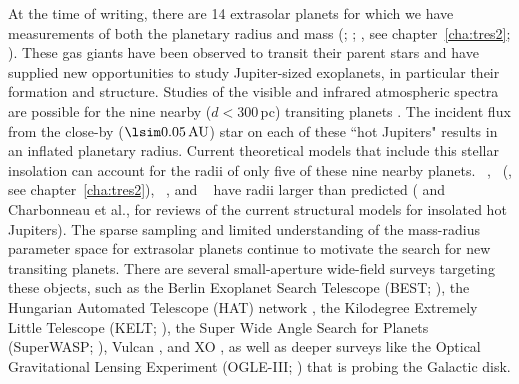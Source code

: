 At the time of writing, there are 14 extrasolar planets for which we have measurements of both the planetary radius and mass (\citealp*[see][for a review]{Charbonneau_Brown_Burrows:PPV:2007a}; \citealt{McCullough_Stys_Valenti:apj:2006a}; \citealt{ODonovan_Charbonneau_Mandushev:apjl:2006a}, see chapter~\ref{cha:tres2}; \citealt{Bakos_Noyes_Kovacs:apj:2007a, Collier-Cameron_Bouchy_Hebrard:MNRAS:2007a}). These gas giants have been observed to transit their parent stars and have supplied new opportunities to study Jupiter-sized exoplanets, in particular their formation and structure. Studies of the visible and infrared atmospheric spectra are possible for the nine nearby ($d<300$\,pc) transiting planets \citep{Charbonneau_Brown_Noyes:apj:2002a, Vidal-Madjar_Lecavelier-des-Etangs_Desert:nat:2003a, Deming_Brown_Charbonneau:apj:2005a, Deming_Seager_Richardson:nat:2005a, Charbonneau_Allen_Megeath:apj:2005a}.
The incident flux from the close-by (\mbox{$\lsim0.05\,\mathrm{AU}$}) star on each of these ``hot Jupiters" results in an inflated planetary radius. Current theoretical models that include this stellar insolation can account for the radii of only five of these nine nearby planets. \hdTZNb\ \citep{Charbonneau_Brown_Latham:apjl:2000a, Henry_Marcy_Butler:apj:2000a}, \tresTwo\ (\citealp{ODonovan_Charbonneau_Mandushev:apjl:2006a}, see chapter~\ref{cha:tres2}), \hatponeb\ \citep{Bakos_Noyes_Kovacs:apj:2007a}, and \wasponeb\ \citep{Collier-Cameron_Bouchy_Hebrard:MNRAS:2007a} have radii larger than predicted (\citealp[see][]{Laughlin_Wolf_Vanmunster:apj:2005a} and Charbonneau et al., \citeyear{Charbonneau_Brown_Burrows:PPV:2007a} for reviews of the current structural models for insolated hot Jupiters).
The sparse sampling and limited understanding of the mass-radius parameter space for extrasolar planets continue to motivate the search for new transiting planets. There are several small-aperture wide-field surveys targeting these objects, such as the Berlin Exoplanet Search Telescope (BEST; \citealt{Rauer_Eisloffel_Erikson:pasp:2004a}), the Hungarian Automated Telescope (HAT) network \citep{Bakos_Lazar_Papp:pasp:2002a, Bakos_Noyes_Kovacs:pasp:2004a}, the Kilodegree Extremely Little Telescope (KELT; \citealt*{Pepper_Gould_Depoy:AIP:2004a}), the Super Wide Angle Search for Planets (SuperWASP; \citealt{Street_Pollaco_Fitzsimmons:ASP:2003a}), Vulcan \citep{Borucki_Caldwell_Koch:pasp:2001a}, and XO \citep{McCullough_Stys_Valenti:pasp:2005a}, as well as deeper surveys like the Optical Gravitational Lensing Experiment (OGLE-III; \citealt{Udalski_Paczynski_Zebrun:acta:2002a}) that is probing the Galactic disk.

